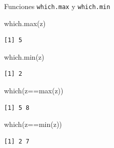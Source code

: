 \documentclass[
  ignorenonframetext,
  aspectratio=169,
  spanish,
]{beamer}
\newenvironment{Shaded}{\begin{snugshade}}{\end{snugshade}}
\newcommand{\FunctionTok}[1]{\textcolor[rgb]{0.28,0.35,0.67}{#1}}
\newcommand{\NormalTok}[1]{\textcolor[rgb]{0.00,0.23,0.31}{#1}}
\newcommand{\SpecialCharTok}[1]{\textcolor[rgb]{0.37,0.37,0.37}{#1}}
\begin{document}
\begin{frame}[fragile]{Funciones \texttt{which.max} y
\texttt{which.min}}
\label{funciones-which.max-y-which.min}
\begin{Shaded}
\begin{Highlighting}[]
\FunctionTok{which.max}\NormalTok{(z)}
\end{Highlighting}
\end{Shaded}

\begin{verbatim}
[1] 5
\end{verbatim}

\begin{Shaded}
\begin{Highlighting}[]
\FunctionTok{which.min}\NormalTok{(z)}
\end{Highlighting}
\end{Shaded}

\begin{verbatim}
[1] 2
\end{verbatim}

\begin{Shaded}
\begin{Highlighting}[]
\FunctionTok{which}\NormalTok{(z}\SpecialCharTok{==}\FunctionTok{max}\NormalTok{(z))}
\end{Highlighting}
\end{Shaded}

\begin{verbatim}
[1] 5 8
\end{verbatim}

\begin{Shaded}
\begin{Highlighting}[]
\FunctionTok{which}\NormalTok{(z}\SpecialCharTok{==}\FunctionTok{min}\NormalTok{(z))}
\end{Highlighting}
\end{Shaded}

\begin{verbatim}
[1] 2 7
\end{verbatim}
\end{frame}
\end{document}
